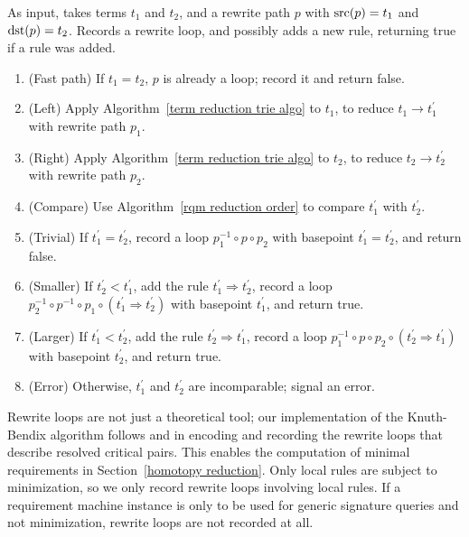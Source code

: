 \documentclass[../generics]{subfiles}
\begin{document}
\begin{algorithm}\label{add rule derived algo}
As input, takes terms $t_1$ and $t_2$, and a rewrite path $p$ with $\operatorname{src}(p)=t_1$ and $\operatorname{dst}(p)=t_2$. Records a rewrite loop, and possibly adds a new rule, returning true if a rule was added.
\begin{enumerate}
\item (Fast path) If $t_1=t_2$, $p$ is already a loop; record it and return false.
\item (Left) Apply Algorithm~\ref{term reduction trie algo} to $t_1$, to reduce $t_1\rightarrow t_1^\prime$ with rewrite path $p_1$.
\item (Right) Apply Algorithm~\ref{term reduction trie algo} to $t_2$, to reduce $t_2\rightarrow t_2^\prime$ with rewrite path $p_2$.
\item (Compare) Use Algorithm~\ref{rqm reduction order} to compare $t_1^\prime$ with $t_2^\prime$.
\item (Trivial) If $t_1^\prime=t_2^\prime$, record a loop $p_1^{-1}\circ p\circ p_2$ with basepoint $t_1^\prime=t_2^\prime$, and return false.
\item (Smaller) If $t_2^\prime<t_1^\prime$, add the rule $t_1^\prime\Rightarrow t_2^\prime$, record a loop $p_2^{-1}\circ p^{-1}\circ p_1\circ (t_1^\prime\Rightarrow t_2^\prime)$ with basepoint $t_1^\prime$, and return true.
\item (Larger) If $t_1^\prime<t_2^\prime$, add the rule $t_2^\prime\Rightarrow t_1^\prime$, record a loop $p_1^{-1}\circ p \circ p_2 \circ (t_2^\prime\Rightarrow t_1^\prime)$ with basepoint $t_2^\prime$, and return true.
\item (Error) Otherwise, $t_1^\prime$ and $t_2^\prime$ are incomparable; signal an error.
\end{enumerate}
\end{algorithm}
Rewrite loops are not just a theoretical tool; our implementation of the Knuth-Bendix algorithm follows \cite{loggedrewriting} and \cite{homotopicalcompletion} in encoding and recording the rewrite loops that describe resolved critical pairs. This enables the computation of minimal requirements in Section~\ref{homotopy reduction}. Only local rules are subject to minimization, so we only record rewrite loops involving local rules. If a requirement machine instance is only to be used for generic signature queries and not minimization, rewrite loops are not recorded at all.
\end{document}
